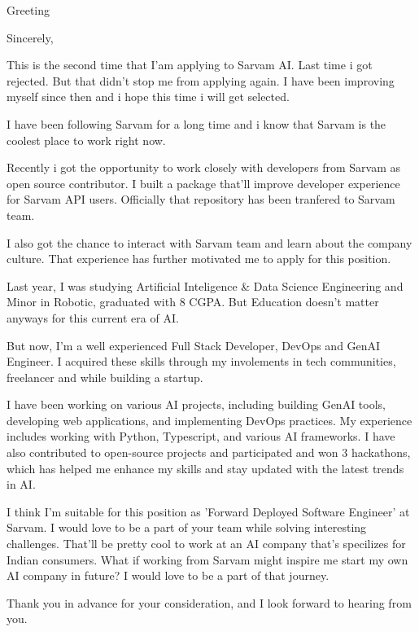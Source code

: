\documentclass[11pt,a4paper,sans]{moderncv}
\begin{document}
\date{23-04-2026}
\opening{Greeting}
\closing{Sincerely,}
\makelettertitle

This is the second time that I'am applying to Sarvam AI. Last time i got rejected. But that didn't stop me from applying again. I have been improving myself since then and i hope this time i will get selected.

I have been following Sarvam for a long time and i know that Sarvam is the coolest place to work right now.

Recently i got the opportunity to work closely with developers from Sarvam as open source contributor. I built a package that'll improve developer experience for Sarvam API users. Officially that repository has been tranfered to Sarvam team.

I also got the chance to interact with Sarvam team and learn about the company culture. That experience has further motivated me to apply for this position.

Last year, I was studying Artificial Inteligence \& Data Science Engineering and Minor in Robotic, graduated with 8 CGPA. But Education doesn't matter anyways for this current era of AI.

But now, I'm a well experienced Full Stack Developer, DevOps and GenAI Engineer. I acquired these skills through my involements in tech communities, freelancer and while building a startup.

I have been working on various AI projects, including building GenAI tools, developing web applications, and implementing DevOps practices. My experience includes working with Python, Typescript, and various AI frameworks. I have also contributed to open-source projects and participated and won 3 hackathons, which has helped me enhance my skills and stay updated with the latest trends in AI.

I think I'm suitable for this position as 'Forward Deployed Software Engineer' at Sarvam. I would love to be a part of your team while solving interesting challenges. That'll be pretty cool to work at an AI company that's specilizes for Indian consumers. What if working from Sarvam might inspire me start my own AI company in future? I would love to be a part of that journey.

Thank you in advance for your consideration, and I look forward to hearing from you.

\makeletterclosing
\end{document}
